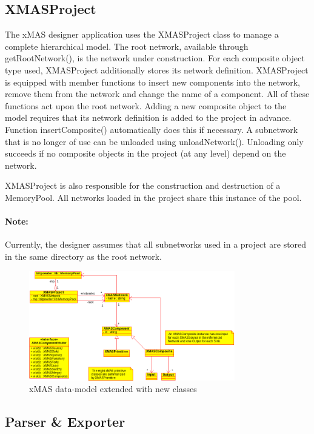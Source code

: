 \subsection{XMASProject}

The xMAS designer application uses the XMASProject class to manage a complete
hierarchical model. The root network, available through getRootNetwork(), is
the network under construction. For each composite object type used, XMASProject
additionally stores its network definition. XMASProject is equipped with member
functions to insert new components into the network, remove them from the network
and change the name of a component. All of these functions act upon the root network.
Adding a new composite object to the model requires that its network definition
is added to the project in advance. Function insertComposite() automatically does
this if necessary. A subnetwork that is no longer of use can be unloaded using
unloadNetwork(). Unloading only succeeds if no composite objects in the project
(at any level) depend on the network.

XMASProject is also responsible for the construction and destruction of a MemoryPool.
All networks loaded in the project share this instance of the pool.

\paragraph{Note:}
Currently, the designer assumes that all subnetworks used in a project are
stored in the same directory as the root network.

\begin{figure}
    \centering
    \includegraphics[width=0.8\textwidth]{new-xmas-datamodel}
    \caption{xMAS data-model extended with new classes}
\end{figure}


\subsection{Parser \& Exporter}

